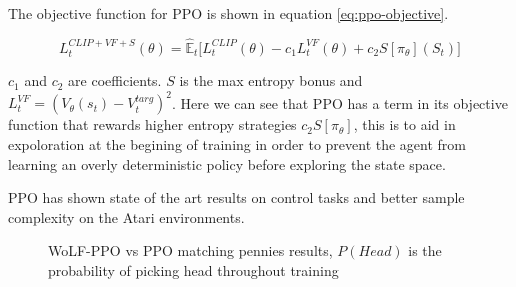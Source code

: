 \documentclass[conference]{IEEEtran}
\begin{document}
The objective function for PPO is shown in equation \ref{eq:ppo-objective}.

\begin{equation}
    L_t^{CLIP+VF+S}(\theta) = \hat{\mathbb{E}}_t\big[L_t^{CLIP}(\theta)-c_1L_t^{VF}(\theta)+c_2S[\pi_{\theta}](S_t)\big]
    \label{eq:ppo-objective}
\end{equation}

$c_1$ and $c_2$ are coefficients. $S$ is the max entropy bonus and $L_t^{VF} = (V_{\theta}(s_t)-V_t^{targ})^2$. Here we can see that PPO has a term in its objective function that rewards higher entropy strategies $c_2S[\pi_{\theta}]$, this is to aid in expoloration at the begining of training in order to prevent the agent from learning an overly deterministic policy before exploring the state space. 

PPO has shown state of the art results on control tasks and better sample complexity on the Atari environments.

\begin{figure}[htbp]
    \caption{WoLF-PPO vs PPO matching pennies results, $P(Head)$ is the probability of picking head throughout training}
\end{figure}
\end{document}
